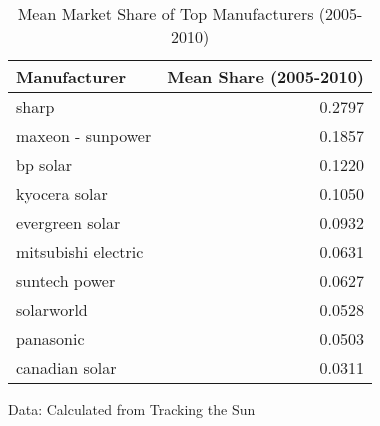 \begin{table}[!t]
\caption*{
{\large Mean Market Share of Top Manufacturers (2005-2010)}
} 
\fontsize{12.0pt}{14.4pt}\selectfont
\begin{tabular*}{\linewidth}{@{\extracolsep{\fill}}lr}
\toprule
Manufacturer & Mean Share (2005-2010) \\ 
\midrule\addlinespace[2.5pt]
sharp & 0.2797 \\ 
maxeon - sunpower & 0.1857 \\ 
bp solar & 0.1220 \\ 
kyocera solar & 0.1050 \\ 
evergreen solar & 0.0932 \\ 
mitsubishi electric & 0.0631 \\ 
suntech power & 0.0627 \\ 
solarworld & 0.0528 \\ 
panasonic & 0.0503 \\ 
canadian solar & 0.0311 \\ 
\bottomrule
\end{tabular*}
\begin{minipage}{\linewidth}
Data: Calculated from Tracking the Sun\\
\end{minipage}
\end{table}
